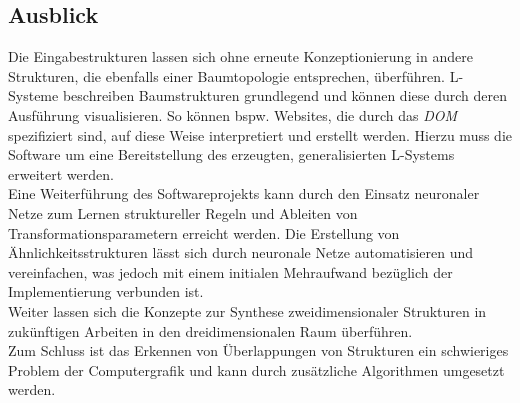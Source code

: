 \subsection*{Ausblick}
Die Eingabestrukturen lassen sich ohne erneute Konzeptionierung in andere Strukturen, die ebenfalls
einer Baumtopologie entsprechen, überführen.
L-Systeme beschreiben Baumstrukturen grundlegend und können diese durch deren Ausführung visualisieren.
So können bspw. Websites, die durch das \textit{DOM} spezifiziert sind, auf diese Weise interpretiert
und erstellt werden.
Hierzu muss die Software um eine Bereitstellung des erzeugten, generalisierten L-Systems erweitert
werden.\\
Eine Weiterführung des Softwareprojekts kann durch den Einsatz neuronaler Netze zum Lernen
struktureller Regeln und Ableiten von Transformationsparametern erreicht werden.
Die Erstellung von Ähnlichkeitsstrukturen lässt sich durch neuronale Netze automatisieren und vereinfachen,
was jedoch mit einem initialen Mehraufwand bezüglich der Implementierung verbunden ist.\\
Weiter lassen sich die Konzepte zur Synthese zweidimensionaler Strukturen in zukünftigen Arbeiten
in den dreidimensionalen Raum überführen.\\
Zum Schluss ist das Erkennen von Überlappungen von Strukturen ein schwieriges Problem der
Computergrafik und kann durch zusätzliche Algorithmen umgesetzt werden.